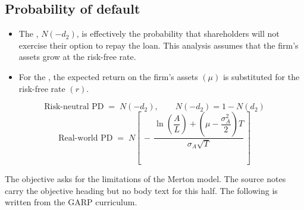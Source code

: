 \subsection*{Probability of default}

\begin{itemize}
\item The , $N(-d_2)$, is effectively
the probability that shareholders will not exercise their option to repay the
loan. This analysis assumes that the firm's assets grow at the risk-free rate.
\item For the , the expected return on the
firm's assets $(\mu)$ is substituted for the risk-free rate $(r)$.
\end{itemize}

\begin{crfmlbox}
\[ \text{Risk-neutral PD} \;=\; N(-d_2), \qquad N(-d_2) = 1 - N(d_2) \]
\[ \text{Real-world PD} \;=\;
   N\left[\,-\,\frac{\ln\!\left(\dfrac{A}{L}\right) + \left(\mu - \dfrac{\sigma_A^{2}}{2}\right)T}
   {\sigma_A\sqrt{T}}\,\right] \]
\end{crfmlbox}

\gapbadge

{\footnotesize\color{FRMGrey}The objective asks for the limitations of the Merton
model. The source notes carry the objective heading but no body text for this
half. The following is written from the GARP curriculum.}

